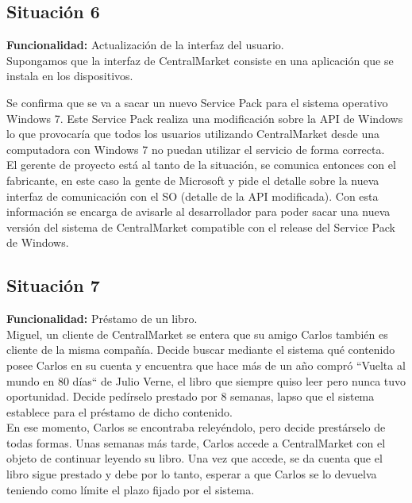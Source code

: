\documentclass[11pt, a4paper, spanish]{article}
\begin{document}
\subsection{Situaci\'on 6}

	\textbf{Funcionalidad:} Actualizaci\'on de la interfaz del usuario.\\

	Supongamos que la interfaz de CentralMarket consiste en una aplicaci\'on que se instala en los dispositivos.

	Se confirma que se va a sacar un nuevo Service Pack para el sistema operativo Windows 7. Este Service Pack realiza una modificaci\'on sobre la   
   API de Windows lo que provocar\'ia que todos los usuarios utilizando CentralMarket desde una computadora con Windows 7 no puedan utilizar el servicio 
   de forma correcta.\\

       El gerente de proyecto est\'a al tanto de la situaci\'on, se comunica entonces con el fabricante, en este caso la gente de Microsoft y pide el    
   detalle sobre la nueva interfaz de comunicaci\'on con el SO (detalle de la API modificada). Con esta informaci\'on se encarga de avisarle al 
   desarrollador para poder sacar una nueva versi\'on del sistema de CentralMarket compatible con el release del Service Pack de Windows.

\subsection{Situaci\'on 7}

	\textbf{Funcionalidad:} Pr\'estamo de un libro.\\

	Miguel, un cliente de CentralMarket se entera que su amigo Carlos tambi\'en es cliente de la misma compa\~{n}\'ia. Decide buscar mediante el sistema    
   qu\'e contenido posee Carlos en su cuenta y encuentra que hace m\'as de un a\~{n}o compr\'o ``Vuelta al mundo en 80 d\'ias`` de Julio Verne, el libro que siempre quiso leer pero nunca tuvo oportunidad. Decide ped\'irselo prestado por 8 semanas, lapso que el sistema establece para el pr\'estamo de dicho contenido. \\

        En ese momento, Carlos se encontraba reley\'endolo, pero decide prest\'arselo de todas formas. Unas semanas m\'as tarde, Carlos accede a  CentralMarket con el objeto de continuar leyendo su libro. Una vez que accede, se da cuenta que el libro sigue prestado y debe por lo tanto, esperar a que Carlos se lo devuelva teniendo como l\'imite el plazo fijado por el sistema. 
\end{document}
